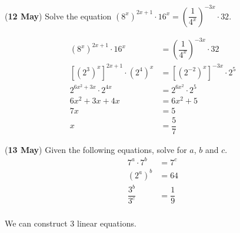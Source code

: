 \documentclass[12pt, answers]{exam} %
\renewcommand{\frac}[2]{\dfrac{#1}{#2}}
\begin{document}
\begin{questions}
	\question (\textbf{12 May}) Solve the equation \(\left(8^x\right)^{2x + 1} \cdot 16^x = \left(\frac{1}{4^x}\right)^{-3x} \cdot 32\).
	\begin{solution}
		\begin{align*}
			\left(8^x\right)^{2x + 1} \cdot 16^x                              & = \left(\frac{1}{4^x}\right)^{-3x} \cdot 32          \\
			\left[\left(2^3\right)^x\right]^{2x + 1} \cdot \left(2^4\right)^x & = \left[\left(2^{-2}\right)^x\right]^{-3x} \cdot 2^5 \\
			2^{6x^2 + 3x}                                 \cdot 2^{4x}        & = 2^{6x^2} \cdot 2^5                                 \\
			6x^2 + 3x + 4x                                                    & = 6x^2 + 5                                           \\
			7x                                                                & = 5                                                  \\
			x                                                                 & = \frac{5}{7}
		\end{align*}
	\end{solution}

	\question (\textbf{13 May})	Given the following equations, solve for \(a\), \(b\) and \(c\).
	\begin{align*}
		7^{a} \cdot 7^{b}      & = 7^{c} \label{eq:13051} \tag{1}       \\
		\left(2^{a}\right)^{b} & = 64 \label{eq:13052} \tag{2}          \\
		\frac{3^{b}}{3^{c}}    & = \frac{1}{9} \label{eq:13053} \tag{3} \\
	\end{align*}
	\begin{solution}
		We can construct 3 linear equations.


\end{solution}
\end{questions}
\end{document}
